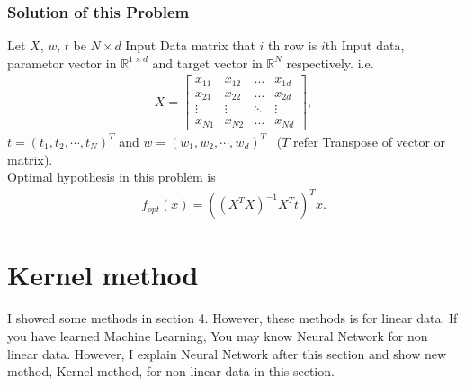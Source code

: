 \documentclass[11pt, a4paper, english, dvipdfmx]{jsarticle}
\theoremstyle{definition}
\newcommand{\R}{\mathbb{R}}
\begin{document}
\subsubsection{Solution of this Problem}
Let $X$, $w$, $t$ be $N\times d$ Input Data matrix that $i$ th row is $i$th Input data, parametor vector in $\R^{1\times d}$ and target vector in $\R^{N}$ respectively. i.e.
\begin{align*}
    X =
    \left[ \begin{array}{cccc} {x_{11}} & {x_{12}} & {\dots} & {x_{1 d}} \\
   {x_{21}} & {x_{22}} & {\dots} & {x_{2 d}} \\
   {\vdots} & {\vdots} & {\ddots} &  {\vdots}\\
  {x_{N 1}} & {x_{N 2}} & {\dots} & {x_{N d}}\end{array}\right],
\end{align*}
$t = (t_{1}, t_{2}, \cdots, t_{N})^{T}$ and $w = (w_{1}, w_{2}, \cdots, w_{d})^{T}$~ ($T$ refer Transpose of vector or matrix).\\
Optimal hypothesis in this problem is
\begin{align*}
    f_{opt}(x) = ((X^{T}X)^{-1}X^{T}t)^{T}x.
\end{align*}

\section{Kernel method}
I showed some methods in section 4. However, these methods is for linear data. 
If you have learned Machine Learning, You may know Neural Network for non linear data.
However, I explain Neural Network after this section and show new method, Kernel method, for non linear data in this section. 
\end{document}
